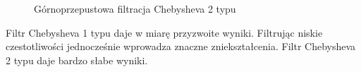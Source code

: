 \documentclass[12pt,titlepage]{report}
\begin{document}
\begin{figure}[!h]
	\centering
	\caption{Górnoprzepustowa filtracja Chebysheva 2 typu}
\end{figure}
Filtr Chebysheva 1 typu daje w miarę przyzwoite wyniki. Filtrując niskie czestotliwości jednocześnie wprowadza znaczne zniekształcenia. Filtr Chebysheva 2 typu daje bardzo słabe wyniki.
\newpage
\end{document}
